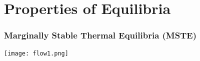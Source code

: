 \section{Properties of Equilibria}


\begin{frame}[fragile]
    \frametitle{Marginally Stable Thermal Equilibria (MSTE)}

        
         
        
        

    
    \begin{center}
        \texttt{[image: flow1.png]}
    \end{center}
\end{frame}



        
